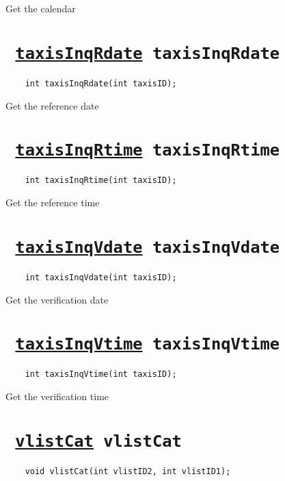 Get the calendar
\ifpdfoutput{}{(\ref{taxisInqCalendar})}


\section*{\tt 
\ifpdf
\hyperref[taxisInqRdate]{taxisInqRdate}
\else
taxisInqRdate
\fi
}
\begin{verbatim}
    int taxisInqRdate(int taxisID);
\end{verbatim}

Get the reference date
\ifpdfoutput{}{(\ref{taxisInqRdate})}


\section*{\tt 
\ifpdf
\hyperref[taxisInqRtime]{taxisInqRtime}
\else
taxisInqRtime
\fi
}
\begin{verbatim}
    int taxisInqRtime(int taxisID);
\end{verbatim}

Get the reference time
\ifpdfoutput{}{(\ref{taxisInqRtime})}


\section*{\tt 
\ifpdf
\hyperref[taxisInqVdate]{taxisInqVdate}
\else
taxisInqVdate
\fi
}
\begin{verbatim}
    int taxisInqVdate(int taxisID);
\end{verbatim}

Get the verification date
\ifpdfoutput{}{(\ref{taxisInqVdate})}


\section*{\tt 
\ifpdf
\hyperref[taxisInqVtime]{taxisInqVtime}
\else
taxisInqVtime
\fi
}
\begin{verbatim}
    int taxisInqVtime(int taxisID);
\end{verbatim}

Get the verification time
\ifpdfoutput{}{(\ref{taxisInqVtime})}


\section*{\tt 
\ifpdf
\hyperref[vlistCat]{vlistCat}
\else
vlistCat
\fi
}
\begin{verbatim}
    void vlistCat(int vlistID2, int vlistID1);
\end{verbatim}

